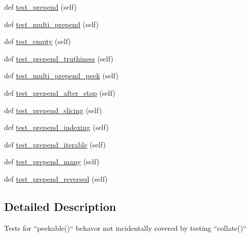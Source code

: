 \begin{DoxyCompactItemize}
def \hyperlink{classmore__itertools_1_1tests_1_1test__more_1_1_peekable_tests_a2b325a10c2d122709af4c6406c777da2}{test\+\_\+prepend} (self)
\item 
def \hyperlink{classmore__itertools_1_1tests_1_1test__more_1_1_peekable_tests_ae2280bc8acfeb263d3858cda42e1e663}{test\+\_\+multi\+\_\+prepend} (self)
\item 
def \hyperlink{classmore__itertools_1_1tests_1_1test__more_1_1_peekable_tests_a1e09938d26facdd9a47bb52f81d6789e}{test\+\_\+empty} (self)
\item 
def \hyperlink{classmore__itertools_1_1tests_1_1test__more_1_1_peekable_tests_af7cf1335b3886e8ea846f43ba7ecce4f}{test\+\_\+prepend\+\_\+truthiness} (self)
\item 
def \hyperlink{classmore__itertools_1_1tests_1_1test__more_1_1_peekable_tests_a32b4e0f8cd73a887aa0cbeb25518b309}{test\+\_\+multi\+\_\+prepend\+\_\+peek} (self)
\item 
def \hyperlink{classmore__itertools_1_1tests_1_1test__more_1_1_peekable_tests_afa13fed0c62a043f99183533a25a2904}{test\+\_\+prepend\+\_\+after\+\_\+stop} (self)
\item 
def \hyperlink{classmore__itertools_1_1tests_1_1test__more_1_1_peekable_tests_a927fd72e2dbf6bd26c2e8b0b1fa61ccf}{test\+\_\+prepend\+\_\+slicing} (self)
\item 
def \hyperlink{classmore__itertools_1_1tests_1_1test__more_1_1_peekable_tests_a22d7c06dc118068faf6df05392799761}{test\+\_\+prepend\+\_\+indexing} (self)
\item 
def \hyperlink{classmore__itertools_1_1tests_1_1test__more_1_1_peekable_tests_acd949cca0a420aeb98e50be2843a4098}{test\+\_\+prepend\+\_\+iterable} (self)
\item 
def \hyperlink{classmore__itertools_1_1tests_1_1test__more_1_1_peekable_tests_a9f465d2972059070c5e17727b4da7ebd}{test\+\_\+prepend\+\_\+many} (self)
\item 
def \hyperlink{classmore__itertools_1_1tests_1_1test__more_1_1_peekable_tests_a93df4dfbd0cd25649bcf9195b73d00de}{test\+\_\+prepend\+\_\+reversed} (self)
\end{DoxyCompactItemize}


\subsection{Detailed Description}
\begin{DoxyVerb}Tests for ``peekable()`` behavor not incidentally covered by testing
``collate()``\end{DoxyVerb}
 

